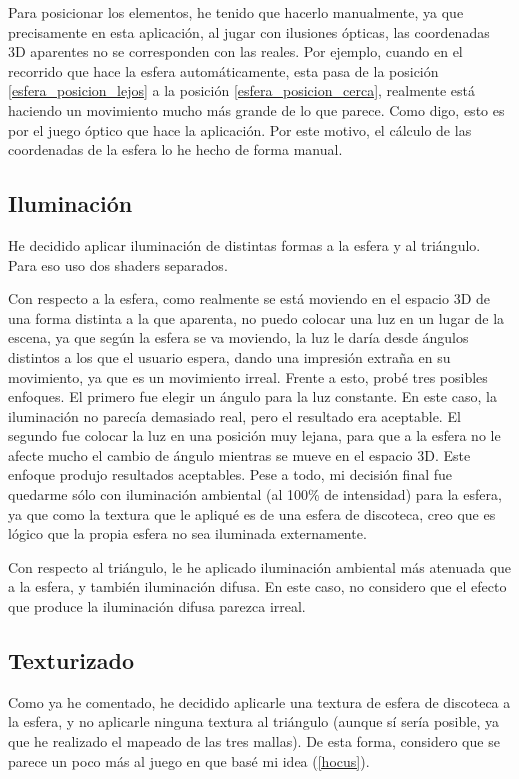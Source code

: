 \documentclass[a4paper,12pt]{article}
\begin{document}
Para posicionar los elementos, he tenido que hacerlo manualmente, ya que precisamente en esta aplicación, al jugar con ilusiones ópticas, las coordenadas 3D aparentes no se corresponden con las reales. Por ejemplo, cuando en el recorrido que hace la esfera automáticamente, esta pasa de la posición \ref{esfera_posicion_lejos} a la posición \ref{esfera_posicion_cerca}, realmente está haciendo un movimiento mucho más grande de lo que parece. Como digo, esto es por el juego óptico que hace la aplicación. Por este motivo, el cálculo de las coordenadas de la esfera lo he hecho de forma manual.

\subsection{Iluminación}

He decidido aplicar iluminación de distintas formas a la esfera y al triángulo. Para eso uso dos shaders separados.

Con respecto a la esfera, como realmente se está moviendo en el espacio 3D de una forma distinta a la que aparenta, no puedo colocar una luz en un lugar de la escena, ya que según la esfera se va moviendo, la luz le daría desde ángulos distintos a los que el usuario espera, dando una impresión extraña en su movimiento, ya que es un movimiento irreal. Frente a esto, probé tres posibles enfoques. El primero fue elegir un ángulo para la luz constante. En este caso, la iluminación no parecía demasiado real, pero el resultado era aceptable. El segundo fue colocar la luz en una posición muy lejana, para que a la esfera no le afecte mucho el cambio de ángulo mientras se mueve en el espacio 3D. Este enfoque produjo resultados aceptables. Pese a todo, mi decisión final fue quedarme sólo con iluminación ambiental (al 100\% de intensidad) para la esfera, ya que como la textura que le apliqué es de una esfera de discoteca, creo que es lógico que la propia esfera no sea iluminada externamente.

Con respecto al triángulo, le he aplicado iluminación ambiental más atenuada que a la esfera, y también iluminación difusa. En este caso, no considero que el efecto que produce la iluminación difusa parezca irreal.

\subsection{Texturizado}

Como ya he comentado, he decidido aplicarle una textura de esfera de discoteca a la esfera, y no aplicarle ninguna textura al triángulo (aunque sí sería posible, ya que he realizado el mapeado de las tres mallas). De esta forma, considero que se parece un poco más al juego en que basé mi idea (\ref{hocus}).
\end{document}
